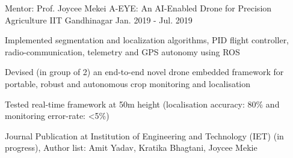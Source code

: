 \newcommand*{\mybox}[1]{\framebox{#1}}

\begin{cventries}
\cventry
    {Mentor: Prof. Joycee Mekei} %
    {A-EYE: An AI-Enabled Drone for Precision Agriculture} %
    {IIT Gandhinagar} %
    {Jan. 2019 - Jul. 2019} %
    {
      \begin{cvitems} %
        \item {Implemented segmentation and localization algorithms, PID flight controller, radio-communication, telemetry and GPS autonomy using ROS}
        \item {Devised (in group of 2) an end-to-end novel drone embedded framework for portable, robust and autonomous crop monitoring and localisation}
        \item {Tested real-time framework at 50m height (localisation accuracy: 80\% and monitoring error-rate: <5\%)}
        \item{Journal Publication at Institution of Engineering and Technology (IET) (in progress), Author list: {Amit Yadav}, Kratika Bhagtani, Joycee Mekie  }%
      \end{cvitems}
    }



\end{cventries}

